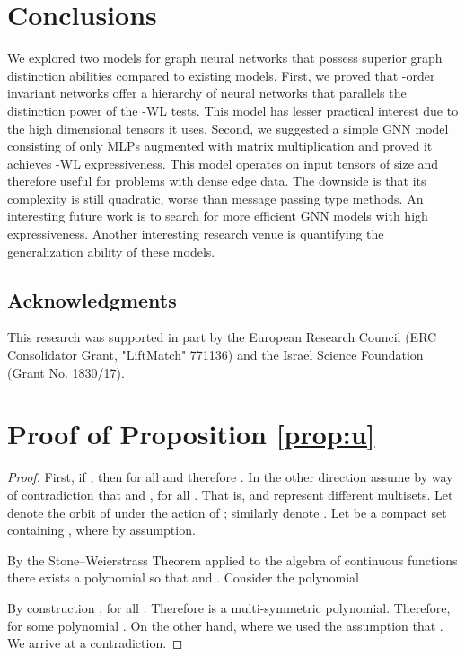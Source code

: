 \documentclass{article}
\begin{document}
\section{Conclusions}
We explored two models for graph neural networks that possess superior graph distinction abilities compared to existing models. First, we proved that -order invariant networks offer a hierarchy of neural networks that parallels the distinction power of the -WL tests. This model has lesser practical interest due to the high dimensional tensors it uses. Second, we suggested a simple GNN model consisting of only MLPs augmented with matrix multiplication and proved it achieves -WL expressiveness. 
This model operates on input tensors of size  and therefore useful for problems with dense edge data. The downside is that its complexity is still quadratic, worse than message passing type methods. An interesting future work is to search for more efficient GNN models with high expressiveness. Another interesting research venue is quantifying the generalization ability of these models. 

\subsection*{Acknowledgments}
This research was supported in part by the European Research Council (ERC Consolidator Grant, "LiftMatch" 771136) and the Israel Science Foundation (Grant No. 1830/17).



\appendix
\section{Proof of Proposition \ref{prop:u}} \label{app:prop1}
\begin{proof}
First, if , then  for all  and therefore . In the other direction assume by way of contradiction that  and , for all . That is,  and  represent different multisets. 
Let  denote the orbit of  under the action of ; similarly denote . Let  be a compact set containing , where  by assumption. 

By the Stone–Weierstrass Theorem applied to the algebra of continuous functions  there exists a polynomial  so that  and .  Consider the polynomial  

By construction , for all . Therefore  is a multi-symmetric polynomial. Therefore,  for some polynomial .
On the other hand,  where we used the assumption that . We arrive at a contradiction.
\end{proof}
\end{document}
